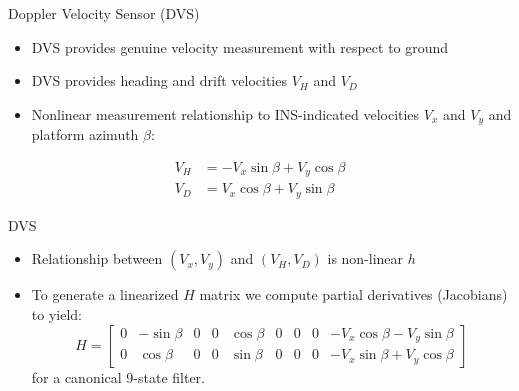 \begin{frame}
Doppler Velocity Sensor (DVS)
 \begin{itemize}
 \item DVS provides genuine velocity measurement with respect to ground
 \item DVS provides heading and drift velocities $V_H$ and $V_D$
 \item Nonlinear measurement relationship to INS-indicated velocities $V_x$ and $V_y$ and platform azimuth $\beta$:
\end{itemize}
\begin{align*}
V_H &= -V_x\sin\beta + V_y\cos\beta\\
V_D &=  V_x\cos\beta + V_y\sin\beta
\end{align*}
\end{frame}

\begin{frame}
DVS
\begin{itemize}
  \item Relationship between $(V_x,V_y)$ and $(V_H,V_D)$ is non-linear $h$
  \item To generate a linearized $H$ matrix we compute partial derivatives (Jacobians) to yield:
\[H=
\begin{bmatrix}
0&-\sin\beta&0&0&\cos\beta&0&0&0&-V_x\cos\beta - V_y\sin\beta\\
0&\cos\beta&0&0&\sin\beta&0&0&0&-V_x\sin\beta + V_y\cos\beta
\end{bmatrix}
\]
for a canonical 9-state filter.
\end{itemize} 
\end{frame}
